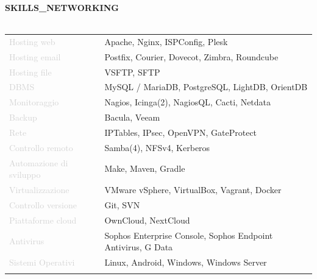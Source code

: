 \documentclass{article}
\begin{document}
\textbf{\textcolor{deepblue}{\uppercase{{{skills_networking}}}}} \\\\ \hfill
\begin{tabular}{ R{4cm} l }
	\textcolor{lightgray}{Hosting web}             & Apache, Nginx, ISPConfig, Plesk                              \\ \hfill
	\textcolor{lightgray}{Hosting email}           & Postfix, Courier, Dovecot, Zimbra, Roundcube                 \\ \hfill
	\textcolor{lightgray}{Hosting file}            & VSFTP, SFTP                                                  \\ \hfill
	\textcolor{lightgray}{DBMS}                    & MySQL / MariaDB, PostgreSQL, LightDB, OrientDB               \\ \hfill
	\textcolor{lightgray}{Monitoraggio}            & Nagios, Icinga(2), NagiosQL, Cacti, Netdata                  \\ \hfill
	\textcolor{lightgray}{Backup}                  & Bacula, Veeam                                                \\ \hfill
	\textcolor{lightgray}{Rete}                    & IPTables, IPsec, OpenVPN, GateProtect                        \\ \hfill
	\textcolor{lightgray}{Controllo remoto}        & Samba(4), NFSv4, Kerberos                                    \\ \hfill
	\textcolor{lightgray}{Automazione di sviluppo} & Make, Maven, Gradle                                          \\ \hfill
	\textcolor{lightgray}{Virtualizzazione}        & VMware vSphere, VirtualBox, Vagrant, Docker                  \\ \hfill
	\textcolor{lightgray}{Controllo versione}      & Git, SVN                                                     \\ \hfill
	\textcolor{lightgray}{Piattaforme cloud}       & OwnCloud, NextCloud                                          \\ \hfill
	\textcolor{lightgray}{Antivirus}               & Sophos Enterprise Console, Sophos Endpoint Antivirus, G Data \\ \hfill
	\textcolor{lightgray}{Sistemi Operativi}       & Linux, Android, Windows, Windows Server                      \\ \hfill
\end{tabular}
\end{document}
